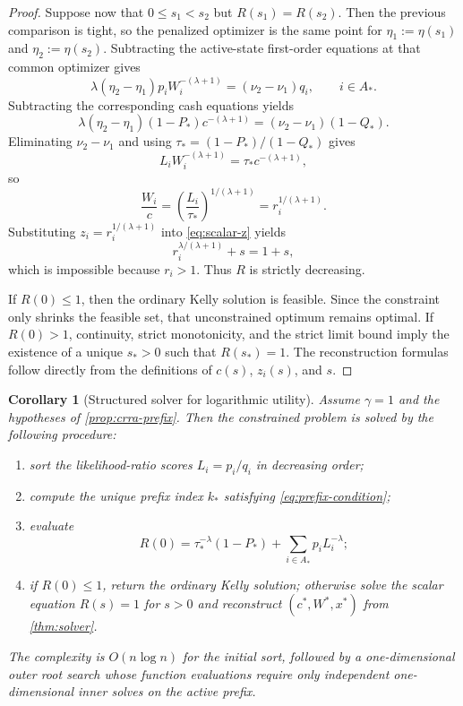 \documentclass[11pt]{article}
\newtheorem{corollary}[theorem]{Corollary}
\theoremstyle{definition}
\theoremstyle{remark}
\newcommand{\1}{\mathbf{1}}
\begin{document}
\begin{proof}
Suppose now that $0\le s_1<s_2$ but $R(s_1)=R(s_2)$. Then the previous comparison is tight, so the penalized optimizer is the same point for $\eta_1:=\eta(s_1)$ and $\eta_2:=\eta(s_2)$. Subtracting the active-state first-order equations at that common optimizer gives
\[
\lambda(\eta_2-\eta_1)p_iW_i^{-(\lambda+1)}=(\nu_2-\nu_1)q_i,
\qquad i\in A_*.
\]
Subtracting the corresponding cash equations yields
\[
\lambda(\eta_2-\eta_1)(1-P_*)c^{-(\lambda+1)}=(\nu_2-\nu_1)(1-Q_*).
\]
Eliminating $\nu_2-\nu_1$ and using $\tau_*=(1-P_*)/(1-Q_*)$ gives
\[
L_iW_i^{-(\lambda+1)}=\tau_* c^{-(\lambda+1)},
\]
so
\[
\frac{W_i}{c}=\left(\frac{L_i}{\tau_*}\right)^{1/(\lambda+1)}=r_i^{1/(\lambda+1)}.
\]
Substituting $z_i=r_i^{1/(\lambda+1)}$ into \eqref{eq:scalar-z} yields
\[
r_i^{\lambda/(\lambda+1)}+s=1+s,
\]
which is impossible because $r_i>1$. Thus $R$ is strictly decreasing.

If $R(0)\le 1$, then the ordinary Kelly solution is feasible. Since the constraint only shrinks the feasible set, that unconstrained optimum remains optimal. If $R(0)>1$, continuity, strict monotonicity, and the strict limit bound imply the existence of a unique $s_*>0$ such that $R(s_*)=1$. The reconstruction formulas follow directly from the definitions of $c(s)$, $z_i(s)$, and $s$.
\end{proof}

\begin{corollary}[Structured solver for logarithmic utility]
\label{cor:algorithm}
Assume $\gamma=1$ and the hypotheses of \cref{prop:crra-prefix}. Then the constrained problem is solved by the following procedure:
\begin{enumerate}[label=\textnormal{(\arabic*)},leftmargin=*]
\item sort the likelihood-ratio scores $L_i=p_i/q_i$ in decreasing order;
\item compute the unique prefix index $k_*$ satisfying \eqref{eq:prefix-condition};
\item evaluate
\[
R(0)=\tau_*^{-\lambda}(1-P_*)+\sum_{i\in A_*} p_iL_i^{-\lambda};
\]
\item if $R(0)\le 1$, return the ordinary Kelly solution; otherwise solve the scalar equation $R(s)=1$ for $s>0$ and reconstruct $(c^*,W^*,x^*)$ from \cref{thm:solver}.
\end{enumerate}
The complexity is $O(n\log n)$ for the initial sort, followed by a one-dimensional outer root search whose function evaluations require only independent one-dimensional inner solves on the active prefix.
\end{corollary}
\end{document}

